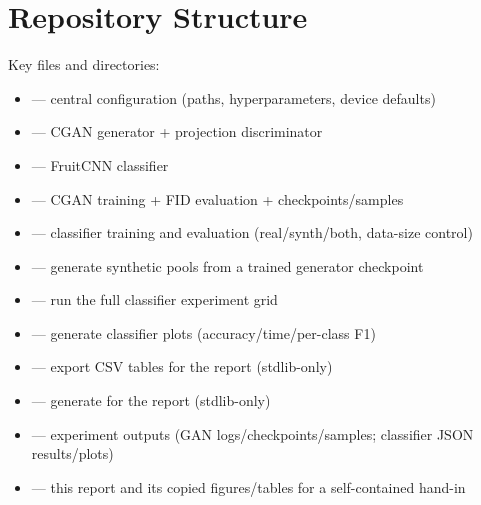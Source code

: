 \section{Repository Structure}

Key files and directories:
\begin{itemize}
\item {} --- central configuration (paths, hyperparameters, device defaults)
\item {} --- CGAN generator + projection discriminator
\item {} --- FruitCNN classifier
\item {} --- CGAN training + FID evaluation + checkpoints/samples
\item {} --- classifier training and evaluation (real/synth/both, data-size control)
\item {} --- generate synthetic pools from a trained generator checkpoint
\item {} --- run the full classifier experiment grid
\item {} --- generate classifier plots (accuracy/time/per-class F1)
\item {} --- export CSV tables for the report (stdlib-only)
\item {} --- generate  for the report (stdlib-only)
\item {} --- experiment outputs (GAN logs/checkpoints/samples; classifier JSON results/plots)
\item {} --- this report and its copied figures/tables for a self-contained hand-in
\end{itemize}
